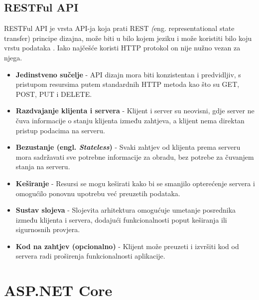 \documentclass{foi}
\begin{document}
\section{RESTFul API}
RESTFul API je vrsta API-ja koja prati REST \textit(eng. {representational state transfer}) principe dizajna, može biti u bilo kojem jeziku i može koristiti bilo koju vrstu podataka \cite{ibm_rest_api}.
Iako najčešće koristi HTTP protokol on nije nužno vezan za njega.\cite{Microsoft2023}
\begin{itemize}
    \item \textbf{Jedinstveno sučelje} - API dizajn mora biti konzistentan i predvidljiv, s pristupom resursima putem standardnih HTTP metoda kao što su GET, POST, PUT i DELETE.
    
    \item \textbf{Razdvajanje klijenta i servera} - Klijent i server su neovisni, gdje server ne čuva informacije o stanju klijenta između zahtjeva, a klijent nema direktan pristup podacima na serveru.
    
    \item \textbf{Bezustanje (engl. \textit{Stateless})} - Svaki zahtjev od klijenta prema serveru mora sadržavati sve potrebne informacije za obradu, bez potrebe za čuvanjem stanja na serveru.
    
    \item \textbf{Keširanje} - Resursi se mogu keširati kako bi se smanjilo opterećenje servera i omogućilo ponovnu upotrebu već preuzetih podataka.
    
    \item \textbf{Sustav slojeva} - Slojevita arhitektura omogućuje umetanje posrednika između klijenta i servera, dodajući funkcionalnosti poput keširanja ili sigurnosnih provjera.
    
    \item \textbf{Kod na zahtjev (opcionalno)} - Klijent može preuzeti i izvršiti kod od servera radi proširenja funkcionalnosti aplikacije. 
\end{itemize}

\chapter{ASP.NET Core}
\end{document}
